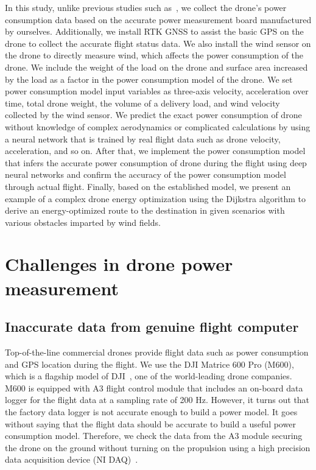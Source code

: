 \documentclass[journal]{./template/IEEEtran}
\begin{document}
In this study, unlike previous studies such as~\cite{ref_9}, we collect the drone's power consumption data based on the accurate power measurement board manufactured by ourselves. 
Additionally, we install RTK GNSS to assist the basic GPS on the drone to collect the accurate flight status data. We also install the wind sensor on the drone to directly measure wind, which affects the power consumption of the drone.
We include the weight of the load on the drone and surface area increased by the load as a factor in the power consumption model of the drone.
We set power consumption model input variables as three-axis velocity, acceleration over time, total drone weight, the volume of a delivery load, and wind velocity collected by the wind sensor.
We predict the exact power consumption of drone without knowledge of complex aerodynamics or complicated calculations by using a neural network that is trained by real flight data such as drone velocity, acceleration, and so on.
After that, we implement the power consumption model that infers the accurate power consumption of drone during the flight using deep neural networks and confirm the accuracy of the power consumption model through actual flight.
Finally, based on the established model, we present an example of a complex drone energy optimization using the Dijkstra algorithm to derive an energy-optimized route to the destination in given scenarios with various obstacles imparted by wind fields.

\label{Section: Related works}














\section{Challenges in drone power measurement}
\label{Section: Challenges in drone power measurement}

\subsection{Inaccurate data from genuine flight computer}
Top-of-the-line commercial drones provide flight data such as power consumption and GPS location during the flight. 
We use the DJI Matrice 600 Pro (M600), which is a flagship model of DJI~\cite{ref_11}, one of the world-leading drone companies. 
M600 is equipped with A3 flight control module that includes an on-board data logger for the flight data at a sampling rate of 200 Hz. However, it turns out that the factory data logger is not accurate enough to build a power model. It goes without saying that the flight data should be accurate to build a useful power consumption model.
Therefore, we check the data from the A3 module securing the drone on the ground without turning on the propulsion using a high precision data acquisition device (NI DAQ)~\cite{ref_12}.
\end{document}
